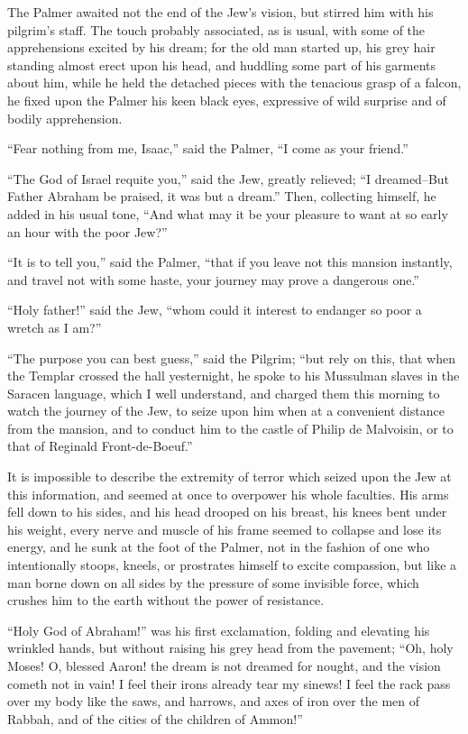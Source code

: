 The Palmer awaited not the end of the Jew's vision, but stirred him with
his pilgrim's staff. The touch probably associated, as is usual, with
some of the apprehensions excited by his dream; for the old man started
up, his grey hair standing almost erect upon his head, and huddling some
part of his garments about him, while he held the detached pieces with
the tenacious grasp of a falcon, he fixed upon the Palmer his keen black
eyes, expressive of wild surprise and of bodily apprehension.

``Fear nothing from me, Isaac,'' said the Palmer, ``I come as your
friend.''

``The God of Israel requite you,'' said the Jew, greatly relieved; ``I
dreamed--But Father Abraham be praised, it was but a dream.'' Then,
collecting himself, he added in his usual tone, ``And what may it be
your pleasure to want at so early an hour with the poor Jew?''

``It is to tell you,'' said the Palmer, ``that if you leave not this
mansion instantly, and travel not with some haste, your journey may
prove a dangerous one.''

``Holy father!'' said the Jew, ``whom could it interest to endanger so
poor a wretch as I am?''

``The purpose you can best guess,'' said the Pilgrim; ``but rely on
this, that when the Templar crossed the hall yesternight, he spoke to
his Mussulman slaves in the Saracen language, which I well understand,
and charged them this morning to watch the journey of the Jew, to seize
upon him when at a convenient distance from the mansion, and to conduct
him to the castle of Philip de Malvoisin, or to that of Reginald
Front-de-Boeuf.''

It is impossible to describe the extremity of terror which seized upon
the Jew at this information, and seemed at once to overpower his whole
faculties. His arms fell down to his sides, and his head drooped on his
breast, his knees bent under his weight, every nerve and muscle of his
frame seemed to collapse and lose its energy, and he sunk at the foot of
the Palmer, not in the fashion of one who intentionally stoops, kneels,
or prostrates himself to excite compassion, but like a man borne down on
all sides by the pressure of some invisible force, which crushes him to
the earth without the power of resistance.

``Holy God of Abraham!'' was his first exclamation, folding and
elevating his wrinkled hands, but without raising his grey head from the
pavement; ``Oh, holy Moses! O, blessed Aaron! the dream is not dreamed
for nought, and the vision cometh not in vain! I feel their irons
already tear my sinews! I feel the rack pass over my body like the saws,
and harrows, and axes of iron over the men of Rabbah, and of the cities
of the children of Ammon!''


